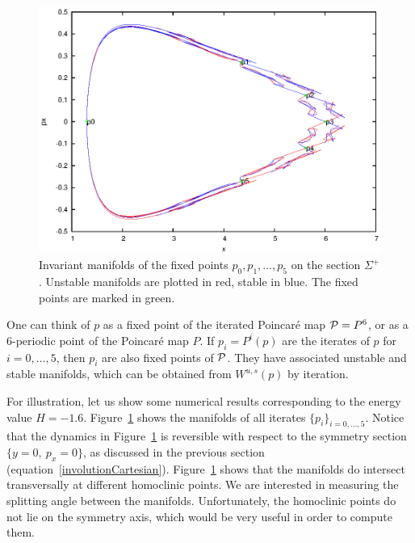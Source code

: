 \begin{figure}
\includegraphics{figs/invmfld_it}
\caption{Invariant manifolds of the fixed points $p_0, p_1,\dots,p_5$
on the section $\Sigma^+$.
Unstable manifolds are plotted in red, stable in blue.
The fixed points are marked in green.}
\label{fig:invmfld_it}
\end{figure}

One can think of $p$ as a fixed point of the iterated Poincar\'e map
$\mathcal{P} = P^6$, or as a $6$-periodic point of the Poincar\'e map $P$.
If $p_i = P^i(p)$ are the iterates of $p$ for $i=0,\dots,5$, then
$p_i$ are also fixed points of $\mathcal{P}$. 
They have associated unstable and stable manifolds, which can be obtained from
$W^{u,s}(p)$ by iteration.

For illustration, let us show some numerical results corresponding to
the energy value $H=-1.6$.
Figure~\ref{fig:invmfld_it} shows the manifolds of all iterates
$\{p_i\}_{i=0,\dots,5}$.
Notice that the dynamics in Figure~\ref{fig:invmfld_it} is reversible
with respect to the symmetry section $\{y=0,\ p_x=0\}$, as discussed
in the previous section (equation~\eqref{involutionCartesian}).
Figure~\ref{fig:invmfld_it} shows that the manifolds do intersect
transversally at different homoclinic points.
We are interested in measuring the splitting angle between the
manifolds.
Unfortunately, the homoclinic points do not lie on the symmetry axis, which
would be very useful in order to compute them.

